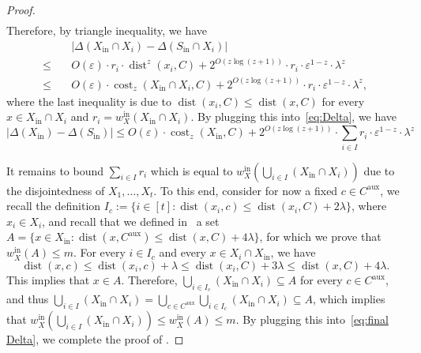 \documentclass[letterpaper,11pt]{article}
\theoremstyle{plain}
\theoremstyle{definition}
\theoremstyle{remark}
\DeclareMathOperator{\cost}{cost}
\DeclareMathOperator{\dist}{dist}
\newcommand{\inl}{\mathrm{in}}
\newcommand{\eps}{\varepsilon}
\newcommand{\aux}{\mathrm{aux}}
\begin{document}
\begin{proof}
\begin{align*}
    \end{align*}
    Therefore, by triangle inequality, we have 
    \begin{align*}
        &\quad \left|\Delta(X_\inl\cap X_i) - \Delta(S_\inl\cap X_i) \right|\\
        \le&\quad O(\eps)\cdot r_i\cdot \dist^z(x_i,C) + 2^{O(z\log (z+1))}\cdot r_i\cdot \eps^{1-z}\cdot \lambda^z\\
        \le&\quad O(\eps)\cdot \cost_z(X_\inl\cap X_i,C) + 2^{O(z\log (z+1))}\cdot r_i\cdot \eps^{1-z}\cdot \lambda^z,
    \end{align*}
    where the last inequality is due to $\dist(x_i,C)\le \dist(x,C)$ for every $x\in X_\inl\cap X_i$ and $r_i = w_X^\inl(X_\inl\cap X_i)$.
    By plugging this into~\eqref{eq:Delta}, we have
    \begin{equation}    
        \label{eq:final Delta}
        \left|\Delta(X_\inl) - \Delta(S_\inl) \right|
        \le O(\eps)\cdot \cost_z(X_\inl, C) + 2^{O(z\log (z+1))}\cdot \sum_{i\in I} r_i\cdot \eps^{1-z}\cdot \lambda^z
    \end{equation}
    
    It remains to bound $\sum_{i\in I} r_i$ which is equal to $w_X^\inl\left(\bigcup_{i\in I} (X_\inl\cap X_i) \right)$ due to the disjointedness of $X_1,\dots, X_t$.
To this end, consider for now a fixed $c\in C^\aux$, we recall the definition $I_c:=\{i\in [t]: \dist(x_i,c)\le \dist(x_i,C) + 2\lambda\}$, where $x_i\in X_i$, and recall that we defined in~ a set $A=\{x\in X_\inl:\dist(x,C^\aux)\le \dist(x,C) + 4\lambda\}$, for which we prove that $w_X^\inl(A)\le m$.
For every $i\in I_c$ and every $x\in X_i\cap X_\inl$, we have 
    \begin{equation}
        \dist(x,c)\le \dist(x_i,c) + \lambda \le \dist(x_i,C) + 3\lambda\le \dist(x,C) + 4\lambda.
    \end{equation}
    This implies that $x\in A$. Therefore, $\bigcup_{i\in I_c} (X_\inl\cap X_i)\subseteq A$ for every $c\in C^\aux$, and thus $\bigcup_{i\in I} (X_\inl\cap X_i)  = \bigcup_{c\in C^\aux}\bigcup_{i\in I_c}(X_\inl\cap X_i)\subseteq A$, which implies that $w_X^\inl\left(\bigcup_{i\in I}(X_\inl\cap X_i)\right)\le w_X^\inl(A)\le  m$. 
    By plugging this into~\eqref{eq:final Delta}, we complete the proof of .
\end{proof}
\end{document}
